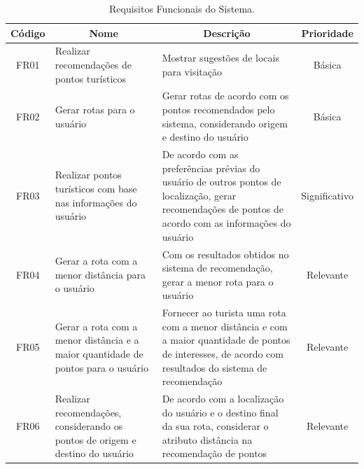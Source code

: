 \begin{table}[H]
    \centering
    \begin{tabular}{|c|p{4.5cm}|p{6.5cm}|c|}
        \hline
		
		\multicolumn{1}{|c|}{\bfseries Código} & \multicolumn{1}{c|}{\bfseries Nome} & \multicolumn{1}{c|}{\bfseries Descrição} & \multicolumn{1}{c|}{\bfseries Prioridade} \\ \hline
		
        FR01 & Realizar recomendações de pontos turísticos & Mostrar sugestões de locais para visitação & Básica \\ \hline
        FR02 & Gerar rotas para o usuário & Gerar rotas de acordo com os pontos recomendados pelo sistema, considerando origem e destino do usuário & Básica \\ \hline
        FR03 & Realizar pontos turísticos com base nas informações do usuário & De acordo com as preferências prévias do usuário de outros pontos de localização, gerar recomendações de pontos de acordo com as informações do usuário & Significativo \\ \hline
        FR04 & Gerar a rota com a menor distância para o usuário & Com os resultados obtidos no sistema de recomendação, gerar a menor rota para o usuário & Relevante \\ \hline
        FR05 & Gerar a rota com a menor distância e a maior quantidade de pontos para o usuário & Fornecer ao turista uma rota com a menor distância e com a maior quantidade de pontos de interesses, de acordo com resultados do sistema de recomendação & Relevante\\ \hline
        FR06 & Realizar recomendações, considerando os pontos de origem e destino do usuário & De acordo com a localização do usuário e o destino final da sua rota, considerar o atributo distância na recomendação de pontos & Relevante \\ \hline
    \end{tabular}
    \caption{Requisitos Funcionais do Sistema.}
    \label{tab:functional_requirements}
\end{table}

